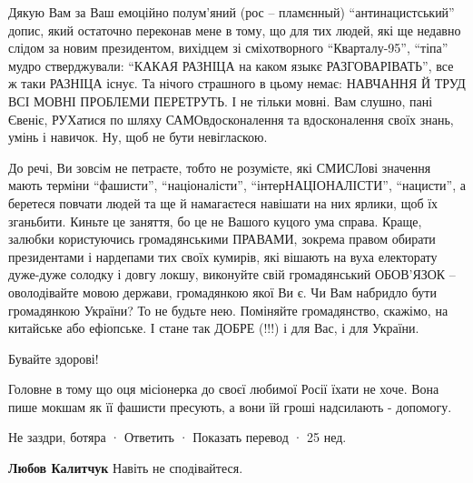 \begin{itemize}
Дякую Вам за Ваш емоційно полум’яний (рос – пламєнный) \enquote{антинацистський} допис,
який остаточно переконав мене в тому, що для тих людей, які ще недавно слідом
за новим президентом, вихідцем зі сміхотворного \enquote{Кварталу-95}, \enquote{тіпа} мудро
стверджували: \enquote{КАКАЯ РАЗНІЦА на каком языкє РАЗГОВАРІВАТЬ}, все ж таки РАЗНІЦА
існує. Та нічого страшного в цьому немає: НАВЧАННЯ Й ТРУД ВСІ МОВНІ ПРОБЛЕМИ
ПЕРЕТРУТЬ. І не тільки мовні. Вам слушно, пані Євеніє, РУХатися по шляху
САМОвдосконалення та вдосконалення своїх знань, умінь і навичок. Ну, щоб не
бути невігласкою. 

До речі, Ви зовсім не петраєте, тобто не розумієте, які СМИСЛові значення мають
терміни \enquote{фашисти}, \enquote{націоналісти}, \enquote{інтерНАЦІОНАЛІСТИ}, \enquote{нацисти}, а беретеся
повчати людей та ще й намагаєтеся навішати на них ярлики, щоб їх зганьбити.
Киньте це заняття, бо це не Вашого куцого ума справа. Краще, залюбки
користуючись громадянськими ПРАВАМИ, зокрема правом обирати президентами і
нардепами тих своїх кумирів, які вішають на вуха електорату дуже-дуже солодку і
довгу локшу, виконуйте свій громадянський ОБОВ’ЯЗОК – оволодівайте мовою
держави, громадянкою якої Ви є. Чи Вам набридло бути громадянкою України? То не
будьте нею. Поміняйте громадянство, скажімо, на китайське або ефіопське. І
стане так ДОБРЕ (!!!) і для Вас, і для України.

Бувайте здорові!


Головне в тому що оця місіонерка до своєї любимої Росії їхати не хоче. Вона
пише мокшам як її фашисти пресують, а вони їй гроші надсилають - допомогу.

\begin{itemize}
 
Не заздри, ботяра
 · Ответить · Показать перевод · 25 нед.
 
\textbf{Любов Калитчук} Навіть не сподівайтеся.

 

\end{itemize}
\end{itemize}
